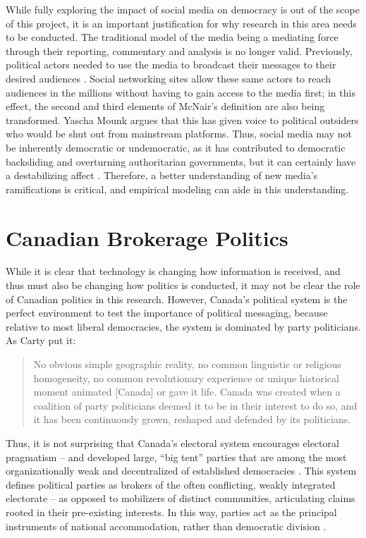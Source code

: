 While fully exploring the impact of social media on democracy is out of the
scope of this project, it is an important justification for why research in this
area needs to be conducted. The traditional model of the media being a mediating
force through their reporting, commentary and analysis is no longer valid.
Previously, political actors needed to use the media to broadcast their messages
to their desired audiences \cite{mcnair2017introduction}. Social networking
sites allow these same actors to reach audiences in the millions without having
to gain access to the media first; in this effect, the second and third elements
of McNair’s definition are also being transformed. Yascha Mounk argues that this
has given voice to political outsiders who would be shut out from mainstream
platforms. Thus, social media may not be inherently democratic or undemocratic,
as it has contributed to democratic backsliding and overturning authoritarian
governments, but it can certainly have a destabilizing affect
\cite{mounk2018people}. Therefore, a better understanding of new media’s
ramifications is critical, and empirical modeling can aide in this
understanding.

\section{Canadian Brokerage Politics}

While it is clear that technology is changing how information is received, and
thus must also be changing how politics is conducted, it may not be clear the
role of Canadian politics in this research. However, Canada’s political system
is the perfect environment to test the importance of political messaging,
because relative to most liberal democracies, the system is dominated by party
politicians. As Carty put it:

\begin{quote}
No obvious simple geographic reality, no common linguistic or religious
homogeneity, no common revolutionary experience or unique historical moment
animated [Canada] or gave it life. Canada was created when a coalition of party
politicians deemed it to be in their interest to do so, and it has been
continuously grown, reshaped and defended by its politicians.
\cite{carty2010political}
\end{quote}

Thus, it is not surprising that Canada’s electoral system encourages electoral
pragmatism -- and developed large, “big tent” parties that are among the most
organizationally weak and decentralized of established democracies
\cite{carty2010political}. This system defines political parties as brokers of the
often conflicting, weakly integrated electorate -- as opposed to mobilizers of
distinct communities, articulating claims rooted in their pre-existing
interests. In this way, parties act as the principal instruments of national
accommodation, rather than democratic division \cite{carty2010political}.

